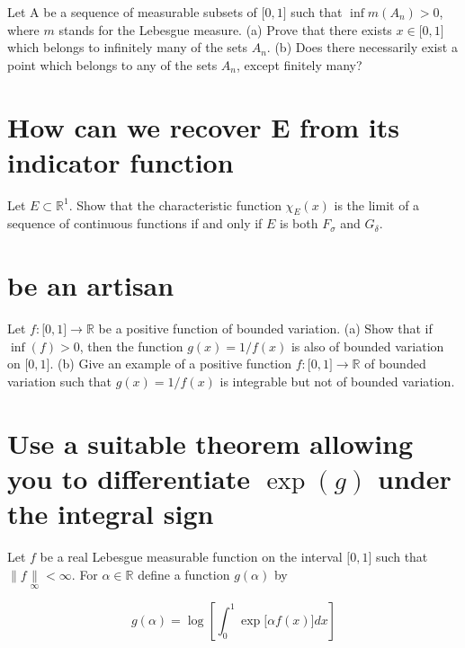 Let A be a sequence of measurable subsets of \(\lbrack 0,1\rbrack\) such that \(\inf m\left( A_{n} \right) > 0\), where \(m\) stands for the Lebesgue measure. (a) Prove that there exists \(x \in \lbrack 0,1\rbrack\) which belongs to infinitely many of the sets \(A_{n}\). (b) Does there necessarily exist a point which belongs to any of the sets \(A_{n}\), except finitely many?

\chapter{How can we recover E from its indicator function}\label{how-can-we-recover-e-from-its-indicator-function}

Let \(E \subset \mathbb{R}^{1}\). Show that the characteristic function \(\chi_{E}(x)\) is the limit of a sequence of continuous functions if and only if \(E\) is both \(F_{\sigma}\) and \(G_{\delta}\).

\chapter{be an artisan}\label{be-an-artisan}

Let \(f:\lbrack 0,1\rbrack\rightarrow\mathbb{R}\) be a positive function of bounded variation. (a) Show that if \(\inf(f) > 0\), then the function \(g(x) = 1/f(x)\) is also of bounded variation on \(\lbrack 0,1\rbrack\). (b) Give an example of a positive function \(f:\lbrack 0,1\rbrack\rightarrow\mathbb{R}\) of bounded variation such that \(g(x) = 1/f(x)\) is integrable but not of bounded variation.

\chapter{\texorpdfstring{Use a suitable theorem allowing you to differentiate \(\exp(g)\) under the integral sign}{Use a suitable theorem allowing you to differentiate \textbackslash exp(g) under the integral sign}}\label{use-a-suitable-theorem-allowing-you-to-differentiate-exp-g-under-the-integral-sign}

Let \(f\) be a real Lebesgue measurable function on the interval \(\lbrack 0,1\rbrack\) such that \(\parallel f\underset{\infty}{\parallel} < \infty\). For \(\alpha \in \mathbb{R}\) define a function \(g(\alpha)\) by

\[g(\alpha) = \log\left\lbrack {\int_{0}^{1}\exp\lbrack\alpha f(x)\rbrack dx} \right\rbrack\]



